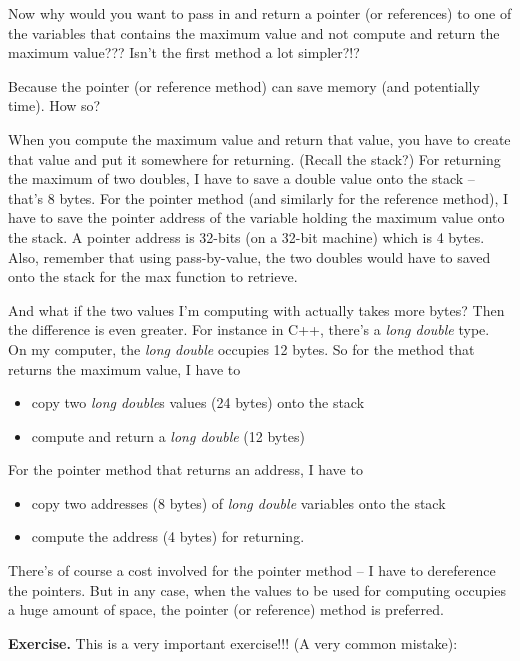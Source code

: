 \documentclass[
]{article}
\providecommand{\tightlist}{%
  \setlength{\itemsep}{0pt}\setlength{\parskip}{0pt}}
\begin{document}
Now why would you want to pass in and return a pointer (or references)
to one of the variables that contains the maximum value and not compute
and return the maximum value??? Isn't the first method a lot simpler?!?

Because the pointer (or reference method) can save memory (and
potentially time). How so?

When you compute the maximum value and return that value, you have to
create that value and put it somewhere for returning. (Recall the
stack?) For returning the maximum of two doubles, I have to save a
double value onto the stack -- that's 8 bytes. For the pointer method
(and similarly for the reference method), I have to save the pointer
address of the variable holding the maximum value onto the stack. A
pointer address is 32-bits (on a 32-bit machine) which is 4 bytes. Also,
remember that using pass-by-value, the two doubles would have to saved
onto the stack for the max function to retrieve.

And what if the two values I'm computing with actually takes more bytes?
Then the difference is even greater. For instance in C++, there's a
\emph{long double} type. On my computer, the \emph{long double} occupies
12 bytes. So for the method that returns the maximum value, I have to

\begin{itemize}
\tightlist
\item
  copy two \emph{long double}s values (24 bytes) onto the stack
\item
  compute and return a \emph{long double} (12 bytes)
\end{itemize}

For the pointer method that returns an address, I have to

\begin{itemize}
\tightlist
\item
  copy two addresses (8 bytes) of \emph{long double} variables onto the
  stack
\item
  compute the address (4 bytes) for returning.
\end{itemize}

There's of course a cost involved for the pointer method -- I have to
dereference the pointers. But in any case, when the values to be used
for computing occupies a huge amount of space, the pointer (or
reference) method is preferred.

\textbf{Exercise.} This is a very important exercise!!! (A very common
mistake):
\end{document}
